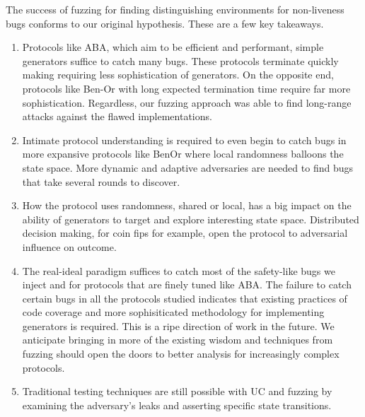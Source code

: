 
The success of fuzzing for finding distinguishing environments for non-liveness bugs conforms to our original hypothesis.
These are a few key takeaways.
\begin{enumerate}
\item Protocols like ABA, which aim to be efficient and performant, simple generators suffice to catch many bugs. These protocols terminate quickly making requiring less sophistication of generators. On the opposite end, protocols like Ben-Or with long expected termination time require far more sophistication. Regardless, our fuzzing approach was able to find long-range attacks against the flawed implementations.
\item Intimate protocol understanding is required to even begin to catch bugs in more expansive protocols like BenOr where local randomness balloons the state space. More dynamic and adaptive adversaries are needed to find bugs that take several rounds to discover. 
\item How the protocol uses randomness, shared or local, has a big impact on the ability of generators to target and explore interesting state space. Distributed decision making, for coin fips for example, open the protocol to adversarial influence on outcome. 
\item The real-ideal paradigm suffices to catch most of the safety-like bugs we inject and for protocols that are finely tuned like ABA. The failure to catch certain bugs in all the protocols studied indicates that existing practices of code coverage and more sophisiticated methodology for implementing generators is required. This is a ripe direction of work in the future. We anticipate bringing in more of the existing wisdom and techniques from fuzzing should open the doors to better analysis for increasingly complex protocols.
\item Traditional testing techniques are still possible with UC and fuzzing by examining the adversary's leaks and asserting specific state transitions.
\end{enumerate}

